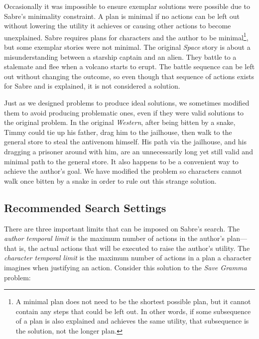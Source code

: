 \documentclass{nilreport}
\begin{document}
Occasionally it was impossible to ensure exemplar solutions were possible
due to Sabre's minimality constraint. A plan is minimal if no actions
can be left out without lowering the utility it achieves or causing
other actions to become unexplained. Sabre requires plans for characters
and the author to be minimal\footnote{A minimal plan does not need to be the shortest possible plan, but
it cannot contain any steps that could be left out. In other words,
if some subsequence of a plan is also explained and achieves the same
utility, that subsequence is the solution, not the longer plan.}, but some exemplar stories were not minimal. The original \emph{Space}
story is about a misunderstanding between a starship captain and an
alien. They battle to a stalemate and flee when a volcano starts to
erupt. The battle sequence can be left out without changing the outcome,
so even though that sequence of actions exists for Sabre and is explained,
it is not considered a solution.

Just as we designed problems to produce ideal solutions, we sometimes
modified them to avoid producing problematic ones, even if they were
valid solutions to the original problem. In the original \emph{Western},
after being bitten by a snake, Timmy could tie up his father, drag
him to the jailhouse, then walk to the general store to steal the
antivenom himself. His path via the jailhouse, and his dragging a
prisoner around with him, are an unnecessarily long yet still valid
and minimal path to the general store. It also happens to be a convenient
way to achieve the author's goal. We have modified the problem so
characters cannot walk once bitten by a snake in order to rule out
this strange solution.

\subsection{Recommended Search Settings}

There are three important limits that can be imposed on Sabre's search.
The \emph{author temporal limit} is the maximum number of actions
in the author's plan---that is, the actual actions that will be executed
to raise the author's utility. The \emph{character temporal limit}
is the maximum number of actions in a plan a character imagines when
justifying an action. Consider this solution to the \emph{Save Gramma}
problem:

\medskip{}

\noindent{}
\end{document}
